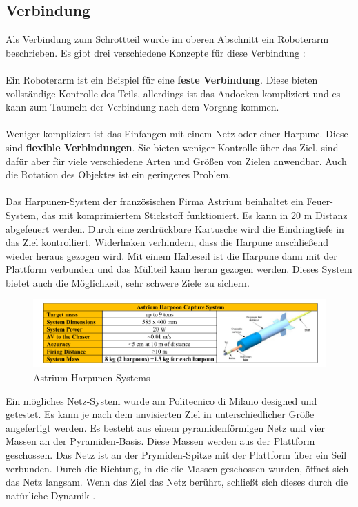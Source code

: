 \documentclass{article}
\begin{document}
\subsection{Verbindung} \label{Verbindung}
Als Verbindung zum Schrottteil wurde im oberen Abschnitt ein Roboterarm beschrieben. Es gibt drei verschiedene Konzepte für diese Verbindung \citep{ruggiero2015small}: \\\\
Ein Roboterarm ist ein Beispiel für eine \textbf{feste Verbindung}. Diese bieten vollständige Kontrolle des Teils, allerdings ist das Andocken kompliziert und es kann zum Taumeln der Verbindung nach dem Vorgang kommen. \\\\
Weniger kompliziert ist das Einfangen mit einem Netz oder einer Harpune. Diese sind \textbf{flexible Verbindungen}. Sie bieten weniger Kontrolle über das Ziel, sind dafür aber für viele verschiedene Arten und Größen von Zielen anwendbar. Auch die Rotation des Objektes ist ein geringeres Problem. \\\\
Das Harpunen-System der französischen Firma Astrium beinhaltet ein Feuer-System, das mit komprimiertem Stickstoff funktioniert. Es kann in 20 m Distanz abgefeuert werden. Durch eine zerdrückbare Kartusche wird die Eindringtiefe in das Ziel kontrolliert. Widerhaken verhindern, dass die Harpune anschließend wieder heraus gezogen wird. Mit einem Halteseil ist die Harpune dann mit der Plattform verbunden und das Müllteil kann heran gezogen werden. Dieses System bietet auch die Möglichkeit, sehr schwere Ziele zu sichern.
\begin{figure}[H]
	\centering
	\includegraphics[width=\linewidth]{bilder/Harpune.png}
	\caption{Astrium Harpunen-Systems \citep{ruggiero2015small}} 
	\label{Harpune}
\end{figure}
\noindent Ein mögliches Netz-System wurde am Politecnico di Milano designed und getestet. Es kann je nach dem anvisierten Ziel in unterschiedlicher Größe angefertigt werden. Es besteht aus einem pyramidenförmigen Netz und vier Massen an der Pyramiden-Basis. Diese Massen werden aus der Plattform geschossen. Das Netz ist an der Prymiden-Spitze mit der Plattform über ein Seil verbunden. Durch die Richtung, in die die Massen geschossen wurden, öffnet sich das Netz langsam. Wenn das Ziel das Netz berührt, schließt sich dieses durch die natürliche Dynamik \citep{lavagna2012debris}.
\end{document}
